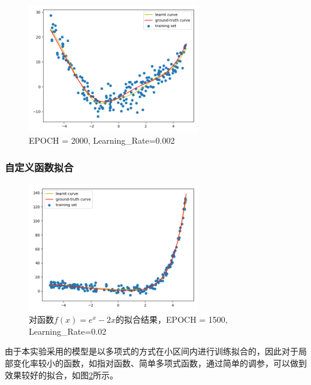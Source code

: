 \documentclass{article}
\begin{document}
\begin{figure}[htb]
\centering
\includegraphics[width=7.5cm]{img/plot2000_002.png}
\caption{EPOCH = 2000, Learning\_Rate=0.002}
\label{fig:funB2}
\end{figure}


\subsubsection{自定义函数拟合}


\begin{figure}[htb]
\centering
\includegraphics[width=7.5cm]{img/good.png}
\caption{对函数$f(x)=e^x - 2x$的拟合结果，EPOCH = 1500, Learning\_Rate=0.02}
\label{fig:funC1}
\end{figure}


由于本实验采用的模型是以多项式的方式在小区间内进行训练拟合的，因此对于局部变化率较小的函数，如指对函数、简单多项式函数，通过简单的调参，可以做到效果较好的拟合，如图\ref{fig:funC1}所示。
\end{document}

